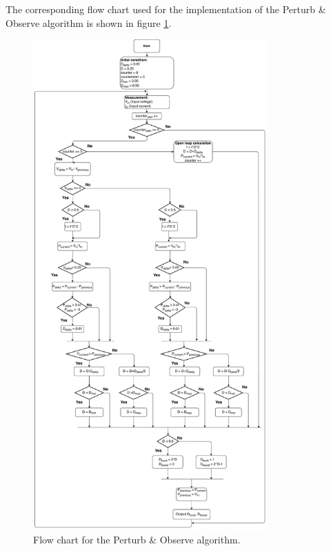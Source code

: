 The corresponding flow chart used for the implementation of the Perturb \& Observe algorithm is shown in figure \ref{fcfinal}.


\begin{figure}[H]
	\begin{center}
		\includegraphics[width=0.8\textwidth]{../Pictures/P1/Flow_chart/2018_11_15_Flow_chart_MPPT_Buck-Boost_converter}
		\caption{Flow chart for the Perturb \& Observe algorithm.}
		\label{fcfinal} 
	\end{center}	
\end{figure}
